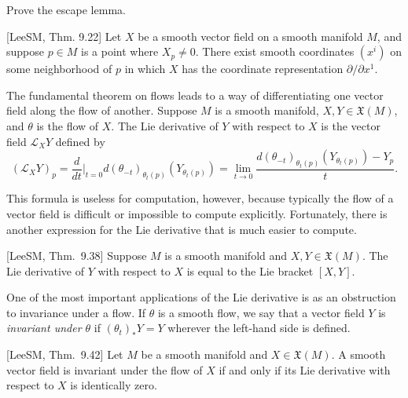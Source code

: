 \begin{exercise}
\label{exer:A.44}
Prove the escape lemma.
\end{exercise}

\begin{proposition}
\label{prop:canonical-form-vector-field}
[LeeSM, Thm. 9.22] Let $X$ be a smooth vector field on a smooth manifold $M$, and suppose $p \in M$ is a point
where $X_p \ne 0$. There exist smooth coordinates $(x^i)$ on some neighborhood of $p$ in
which $X$ has the coordinate representation $\partial/\partial x^1$.
\end{proposition}

The fundamental theorem on flows leads to a way of differentiating one vector
field along the flow of another. Suppose $M$ is a smooth manifold, $X, Y \in \mathfrak{X}(M)$,
and $\theta$ is the flow of $X$. The Lie derivative of $Y$ with respect to $X$ is the vector field
$\mathcal{L}_X Y$ defined by
\[
(\mathcal{L}_X Y)_p = \frac{d}{dt}\bigg|_{t=0} d(\theta_{-t})_{\theta_t(p)}(Y_{\theta_t(p)}) = \lim_{t \to 0} \frac{d(\theta_{-t})_{\theta_t(p)}(Y_{\theta_t(p)}) - Y_p}{t}.
\]

This formula is useless for computation, however, because typically the flow of a vector field is difficult or impossible to compute explicitly. Fortunately, there is another expression for the Lie derivative that is much easier to compute.

\begin{proposition}
\label{prop:lie-derivative-equals-bracket}
[LeeSM, Thm.~9.38] Suppose $M$ is a smooth manifold and $X, Y \in \mathfrak{X}(M)$. The Lie derivative of $Y$ with respect to $X$ is equal to the Lie bracket $[X,Y]$.
\end{proposition}

One of the most important applications of the Lie derivative is as an obstruction to invariance under a flow. If $\theta$ is a smooth flow, we say that a vector field $Y$ is \emph{invariant under $\theta$} if $(\theta_t)_*Y = Y$ wherever the left-hand side is defined.

\begin{proposition}
\label{prop:invariant-vector-field}
[LeeSM, Thm.~9.42] Let $M$ be a smooth manifold and $X \in \mathfrak{X}(M)$. A smooth vector field is invariant under the flow of $X$ if and only if its Lie derivative with respect to $X$ is identically zero.
\end{proposition}

